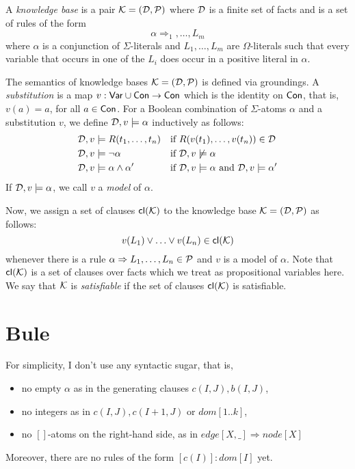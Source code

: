 \documentclass[conference]{IEEEtran}
\begin{document}
A \emph{\bcore knowledge base} is a pair $\mathcal{K}=(\mathcal{D},\mathcal{P})$ where $\mathcal{D}$ is a
finite set of facts and \Pmc is a set of rules of the form 
%
\[\alpha \Rightarrow _1,\ldots,L_m\]
%
where $\alpha$ is a conjunction of $\Sigma$-literals
and $L_1,\ldots,L_m$ are $\Omega$-literals such that every variable
that occurs in one of the $L_i$ does occur in
a positive literal in $\alpha$.

The semantics of \bcore knowledge bases $\mathcal{K}=(\mathcal{D},\mathcal{P})$ is defined via
groundings. A \emph{substitution} is a map
$v:\mathsf{Var}\cup\mathsf{Con}\to\mathsf{Con}$ which is the identity on
$\mathsf{Con}$, that is, $v(a)=a$, for all $a\in\mathsf{Con}$. For a Boolean combination of $\Sigma$-atoms $\alpha$ and a
substitution $v$, we define $\mathcal{D},v\models \alpha$ inductively as
follows: 
%
\begin{align*}
  \mathcal{D},v & \models R(t_1,\ldots,t_n) && \text{if
  $R(v(t_1),\ldots,v(t_n))\in \mathcal{D}$} \\
  \mathcal{D}, v& \models \neg \alpha && \text{if $\mathcal{D},v\not\models \alpha$}
  \\
  \mathcal{D}, v& \models \alpha \wedge \alpha' && \text{if $\mathcal{D},v\models
  \alpha$ and $\mathcal{D},v\models\alpha'$}
\end{align*}
%
If $\mathcal{D},v\models\alpha$, we call $v$ a \emph{model} of $\alpha$.


Now, we assign a set of clauses $\mathsf{cl}(\mathcal{K})$ to the \bcore knowledge
base $\mathcal{K}=(\mathcal{D},\mathcal{P})$ as follows:
%
\[v(L_1)\vee\ldots\vee v(L_n)\in \mathsf{cl}(\mathcal{K})\]
%
whenever there is a rule $\alpha \Rightarrow L_1,\ldots,L_n\in\mathcal{P}$ and $v$ is a model of $\alpha$. 
Note that $\mathsf{cl}(\mathcal{K})$ is a set of clauses over facts which we treat as propositional variables here.  
We say that $\mathcal{K}$ is \emph{satisfiable} if the set of clauses $\mathsf{cl}(\mathcal{K})$ is satisfiable. 

\section{Bule}



{\color{red}For simplicity, I don't use any syntactic sugar, that is,
%
\begin{itemize}

  \item no empty $\alpha$ as in the generating clauses
    $c(I,J),b(I,J)$,

  \item no integers as in $c(I,J),c(I+1,J)$ or $dom[1..k]$,

  \item no $[]$-atoms on the right-hand side, as in $edge[X,\_ ]
    \Rightarrow node[X]$

\end{itemize}
Moreover, there are no rules of the form $[c(I)]:dom[I]$ yet. 
}
\end{document}
